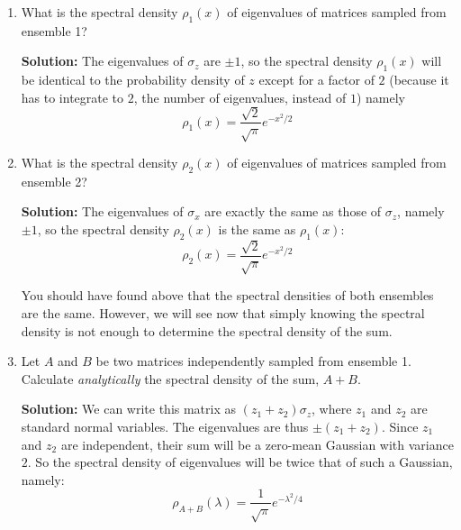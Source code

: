 \documentclass[a4paper]{article}
\begin{document}
\begin{enumerate}[label=(\alph*)]
\item What is the spectral density $\rho_1(x)$ of eigenvalues of matrices sampled from ensemble 1?

\begin{tcolorbox}
\textbf{Solution:}
The eigenvalues of $\sigma_z$ are $\pm 1$,  so the spectral density $\rho_1(x)$ will be identical to the probability density of $z$ except for a factor of $2$ (because it has to integrate to $2$, the number of eigenvalues, instead of $1$) namely
\begin{equation}
    \rho_1(x) = \frac{\sqrt{2}}{\sqrt{\pi}} e^{-x^2/2}
\end{equation}
\end{tcolorbox}

\item What is the spectral density $\rho_2(x)$ of eigenvalues of matrices sampled from ensemble 2?

\begin{tcolorbox}
\textbf{Solution:}
The eigenvalues of $\sigma_x$ are exactly the same as those of $\sigma_z$, namely $\pm 1$,  so the spectral density $\rho_2(x)$ is the same as $\rho_1(x)$:
\begin{equation}
    \rho_2(x) = \frac{\sqrt{2}}{\sqrt{\pi}} e^{-x^2/2}
\end{equation}
\end{tcolorbox}

You should have found above that the spectral densities of both ensembles are the same.  However, we will see now that simply knowing the spectral density is not enough to determine the spectral density of the sum.  
\item Let $A$ and $B$ be two matrices independently sampled from ensemble 1.  Calculate \emph{analytically} the spectral density of the sum, $A + B$.
\begin{tcolorbox}
\textbf{Solution:}
We can write this matrix as $(z_1 + z_2)\sigma_z$, where $z_1$ and $z_2$ are standard normal variables.  The eigenvalues are thus $\pm (z_1 + z_2)$.  Since $z_1$ and $z_2$ are independent, their sum will be a zero-mean Gaussian with variance $2$.  So the spectral density of eigenvalues will be twice that of such a Gaussian, namely:
\begin{equation}
    \rho_{A+B}(\lambda) = \frac{1}{\sqrt{\pi}} e^{-\lambda^2/4}
\end{equation}

\end{tcolorbox}


\end{enumerate}
\end{document}
